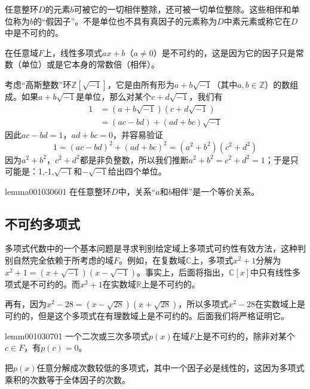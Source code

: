 任意整环$D$的元素$b$可被它的一切相伴整除，还可被一切单位整除。这些相伴和单位称为$b$的“假因子”。不是单位也不具有真因子的元素称为$D$中素元素或称它在$D$中是不可约的。

\begin{example}\label{exam001030605}
在任意域$F$上，线性多项式$ax+b$（$a \neq 0$）是不可约的，这是因为它的因子只是常数（单位）或是它本身的常数倍（相伴）。
\end{example}

\begin{example}\label{exam001030606}
考虑“高斯整数”环$\mathbb{Z}[\sqrt{-1}]$，它是由所有形为$a + b\sqrt{-1}$（其中$a, b \in \mathbb{Z}$）的数组成。如果$a + b\sqrt{-1}$是单位，那么对某个$c + d\sqrt{-1}$，我们有
\[
\begin{aligned}
1 &= (a + b\sqrt{-1})(c+d\sqrt{-1}) \\
&=(ac - bd) + (ad + bc)\sqrt{-1}
\end{aligned}
\]
因此$ac-bd = 1$，$ad+bc = 0$，并容易验证
\[
1 = (ac-bd)^2 + (ad+bc)^2 = (a^2+b^2)(c^2+d^2)
\]
因为$a^2+b^2$，$c^2+d^2$都是非负整数，所以我们推断$a^2+b^2=c^2+d^2=1$；于是只可能是：1,-1,$\sqrt{-1}$和$-\sqrt{-1}$给出四个单位。
\end{example}

\begin{lemma}{}{lemma001030601}
在任意整环$D$中，关系“$a$和$b$相伴”是一个等价关系。
\end{lemma}


\subsection{不可约多项式}\label{subsection0010307}
多项式代数中的一个基本问题是寻求判别给定域上多项式可约性有效方法，这种判别自然完全依赖于所考虑的域$F$。例如，在复数域$\mathbb{C}$上，多项式$x^2+1$分解为$x^2+1=(x+\sqrt{-1})(x-\sqrt{-1})$。事实上，后面将指出，$\mathbb{C}[x]$中只有线性多项式是不可约的。而$x^2+1$在实数域$\mathbb{R}$上是不可约的。

再有，因为$x^2-28=(x-\sqrt{28})(x+\sqrt{28})$，所以多项式$x^2-28$在实数域上是可约的，但是这个多项式在有理数域上是不可约的。后面我们将严格证明它。

\begin{lemma}{}{lemm001030701}
一个二次或三次多项式$p(x)$在域$F$上是不可约的，除非对某个$c \in F$，有$p(c)=0$。
\end{lemma}

把$p(x)$任意分解成次数较低的多项式，其中一个因子必是线性的，这因为多项式乘积的次数等于全体因子的次数。

